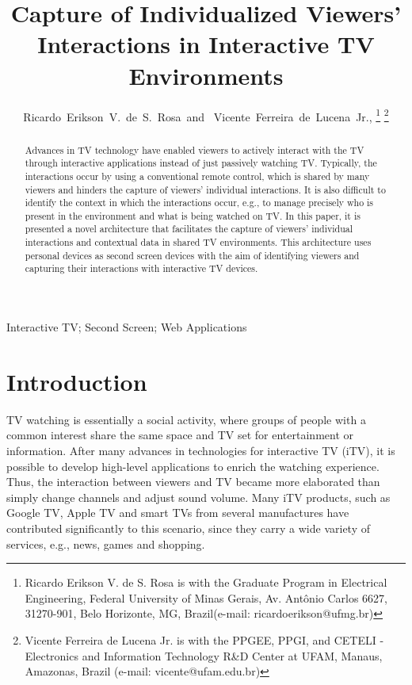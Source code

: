 \documentclass[journal]{IEEEtran}
\begin{document}
\title{Capture of Individualized Viewers' Interactions in Interactive TV Environments}
\author{Ricardo~Erikson~V.~de~S.~Rosa~and~ 
	Vicente~Ferreira~de~Lucena~Jr.,
\thanks{Ricardo Erikson V. de S. Rosa is with the Graduate Program in Electrical Engineering, Federal University of Minas Gerais, Av. Antônio Carlos 6627, 31270-901, Belo Horizonte, MG, Brazil(e-mail: ricardoerikson@ufmg.br)}%
\thanks{Vicente Ferreira de Lucena Jr. is with the PPGEE, PPGI, and CETELI - Electronics and Information Technology R\&D Center at UFAM, Manaus, Amazonas, Brazil (e-mail: vicente@ufam.edu.br)}%
}

\maketitle

\begin{abstract}
Advances in TV technology have enabled viewers to actively interact with the TV through interactive applications instead of just passively watching TV. Typically, the interactions occur by using a conventional remote control, which is shared by many viewers and hinders the capture of viewers' individual interactions. It is also difficult to identify the context in which the interactions occur, e.g., to manage precisely who is present in the environment and what is being watched on TV. In this paper, it is presented a novel architecture that facilitates the capture of viewers' individual interactions and contextual data in shared TV environments. This architecture uses personal devices as second screen devices with the aim of identifying viewers and capturing their interactions with interactive TV devices.
\end{abstract}

\begin{IEEEkeywords}
Interactive TV; Second Screen; Web Applications
\end{IEEEkeywords}

\IEEEpeerreviewmaketitle

\section{Introduction}

TV watching is essentially a social activity, where groups of people with a common interest share the same space and TV set for entertainment or information. After many advances in technologies for interactive TV (iTV), it is possible to develop high-level applications to enrich the watching experience. Thus, the interaction between viewers and TV became more elaborated than simply change channels and adjust sound volume. Many iTV products, such as Google TV, Apple TV and smart TVs from several manufactures have contributed significantly to this scenario, since they carry a wide variety of services, e.g., news, games and shopping.
\end{document}
